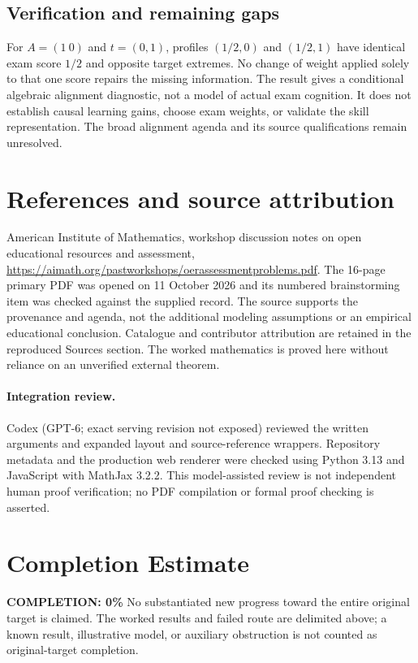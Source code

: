 \documentclass[11pt]{article}
\begin{document}
\subsection{Verification and remaining gaps}
For $A=(1\ 0)$ and $t=(0,1)$, profiles $(1/2,0)$ and $(1/2,1)$ have identical exam score $1/2$ and opposite target extremes. No change of weight applied solely to that one score repairs the missing information. The result gives a conditional algebraic alignment diagnostic, not a model of actual exam cognition. It does not establish causal learning gains, choose exam weights, or validate the skill representation. The broad alignment agenda and its source qualifications remain unresolved.

\section{References and source attribution}
American Institute of Mathematics, workshop discussion notes on open educational resources and assessment, \url{https://aimath.org/pastworkshops/oerassessmentproblems.pdf}. The 16-page primary PDF was opened on 11 October 2026 and its numbered brainstorming item was checked against the supplied record. The source supports the provenance and agenda, not the additional modeling assumptions or an empirical educational conclusion. Catalogue and contributor attribution are retained in the reproduced Sources section. The worked mathematics is proved here without reliance on an unverified external theorem.


\paragraph{Integration review.} Codex (GPT-6; exact serving revision not exposed) reviewed the written arguments and expanded layout and source-reference wrappers. Repository metadata and the production web renderer were checked using Python 3.13 and JavaScript with MathJax 3.2.2. This model-assisted review is not independent human proof verification; no PDF compilation or formal proof checking is asserted.

\section{Completion Estimate}
\noindent\textbf{COMPLETION: 0\%}
No substantiated new progress toward the entire original target is claimed. The worked results and failed route are delimited above; a known result, illustrative model, or auxiliary obstruction is not counted as original-target completion.
\end{document}
